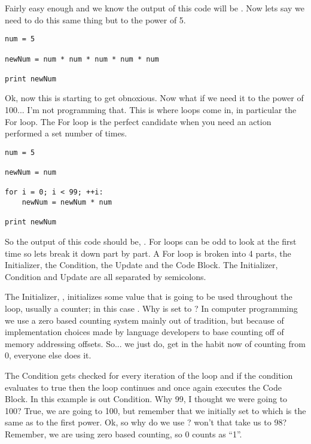 Fairly easy enough and we know the output of this code will be .
Now lets say we need to do this same thing but to the power of 5.

\begin{lstlisting}[caption={Power of 5 Without Loop}]
num = 5

newNum = num * num * num * num * num

print newNum
\end{lstlisting}

Ok, now this is starting to get obnoxious.
Now what if we need it to the power of 100... I'm not programming that.
This is where loops come in, in particular the For loop.
The For loop is the perfect candidate when you need an action performed a set number of times.

\begin{lstlisting}[caption={For Loop}]
num = 5

newNum = num

for i = 0; i < 99; ++i:
    newNum = newNum * num

print newNum
\end{lstlisting}

So the output of this code should be, .
For loops can be odd to look at the first time so lets break it down part by part.
A For loop is broken into 4 parts, the Initializer, the Condition, the Update and the Code Block.
The Initializer, Condition and Update are all separated by semicolons.
\par

The Initializer, , initializes some value that is going to be used throughout the loop, usually a counter; in this case .
Why is  set to ?
In computer programming we use a zero based counting system mainly out of tradition, but because of implementation choices made by language developers to base counting off of memory addressing offsets.
So... we just do, get in the habit now of counting from 0, everyone else does it.
\par

The Condition gets checked for every iteration of the loop and if the condition evaluates to true then the loop continues and once again executes the Code Block.
In this example  is out Condition.
Why 99, I thought we were going to 100?
True, we are going to 100, but remember that we initially set  to  which is the same as  to the first power.
Ok, so why do we use ? won't that take us to 98?
Remember, we are using zero based counting, so 0 counts as ``1''.
\par

